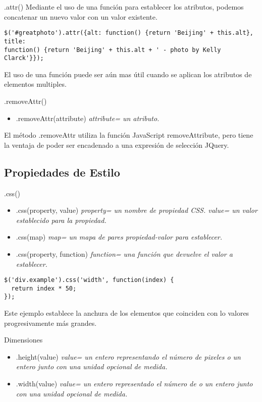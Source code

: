 \begin{frame}[fragile]{.attr()} %
Mediante el uso de una función para establecer los atributos, podemos concatenar un nuevo valor con un valor existente.
\begin{lstlisting}
$('#greatphoto').attr({alt: function() {return 'Beijing' + this.alt}, title:
function() {return 'Beijing' + this.alt + ' - photo by Kelly Clarck'}});
\end{lstlisting}
El uso de una función puede ser aún mas útil cuando se aplican los atributos de
elementos multiples.
\end{frame}

\begin{frame}[fragile]{.removeAttr()} %
\begin{itemize}
    \item .removeAttr(attribute) \textit{ attribute= un atributo.}
\end{itemize}
El método .removeAttr utiliza la función JavaScript removeAttribute, pero tiene
la ventaja de poder ser encadenado a una expresión de selección JQuery.
\end{frame}

\subsection{Propiedades de Estilo} %

\begin{frame}[fragile]{.css()} %
\begin{itemize}
    \item .css(property,  value) \textit{ property= un nombre de propiedad CSS.    
    value= un valor establecido para la propiedad.}
    \item .css(map) \textit{ map= un mapa de pares propiedad-valor para
    establecer.}
    \item .css(property, function) \textit{ function= una función que devuelve el valor a establecer.}
\end{itemize}
\begin{lstlisting}
$('div.example').css('width', function(index) {
  return index * 50;
});
\end{lstlisting}
Este ejemplo establece la anchura de los elementos que coinciden con lo valores
progresivamente más grandes.
\end{frame}

\begin{frame}[fragile]{Dimensiones} %
\begin{itemize}
    \item .height(value) \textit{ value= un entero representando el número de pixeles o un entero junto con una unidad opcional de medida.}
    \item .width(value) \textit{ value= un entero representado el número de o un entero junto con una unidad opcional de medida.}
\end{itemize}
\end{frame}

